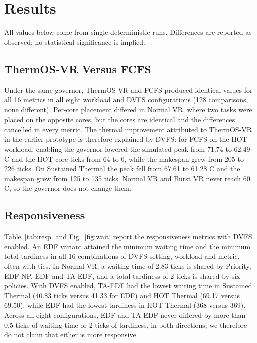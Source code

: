 \documentclass[conference]{IEEEtran}
\begin{document}
\section{Results}\label{sec:results}
All values below come from single deterministic runs. Differences are reported as observed; no statistical significance is implied.

\subsection{ThermOS-VR Versus FCFS}\label{sec:res-thermos}
Under the same governor, ThermOS-VR and FCFS produced identical values for all 16 metrics in all eight workload and DVFS configurations (128 comparisons, none different). Per-core placement differed in Normal VR, where two tasks were placed on the opposite cores, but the cores are identical and the differences cancelled in every metric. The thermal improvement attributed to ThermOS-VR in the earlier prototype is therefore explained by DVFS: for FCFS on the HOT workload, enabling the governor lowered the simulated peak from 71.74 to 62.49 \textdegree{}C and the HOT core-ticks from 64 to 0, while the makespan grew from 205 to 226 ticks. On Sustained Thermal the peak fell from 67.61 to 61.28 \textdegree{}C and the makespan grew from 125 to 135 ticks. Normal VR and Burst VR never reach 60 \textdegree{}C, so the governor does not change them.

\subsection{Responsiveness}\label{sec:res-resp}
Table~\ref{tab:resp} and Fig.~\ref{fig:wait} report the responsiveness metrics with DVFS enabled. An EDF variant attained the minimum waiting time and the minimum total tardiness in all 16 combinations of DVFS setting, workload and metric, often with ties. In Normal VR, a waiting time of 2.83 ticks is shared by Priority, EDF-NP, EDF and TA-EDF, and a total tardiness of 2 ticks is shared by six policies. With DVFS enabled, TA-EDF had the lowest waiting time in Sustained Thermal (40.83 ticks versus 41.33 for EDF) and HOT Thermal (69.17 versus 69.50), while EDF had the lowest tardiness in HOT Thermal (368 versus 369). Across all eight configurations, EDF and TA-EDF never differed by more than 0.5 ticks of waiting time or 2 ticks of tardiness, in both directions; we therefore do not claim that either is more responsive.
\end{document}
